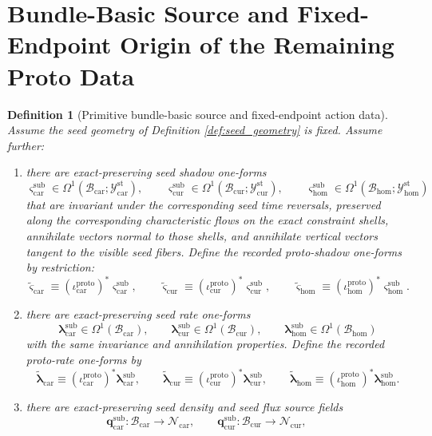 \documentclass[11pt]{article}
\newcommand{\TensorStatTagClass}{\mathcal Y_{\mathrm{car}}^{\mathrm{st}}}
\newcommand{\CurStatTagClass}{\mathcal Y_{\mathrm{cur}}^{\mathrm{st}}}
\newcommand{\HomStatTagClass}{\mathcal Y_{\mathrm{hom}}^{\mathrm{st}}}
\newcommand{\TensorDensityClass}{\mathscr N_{\mathrm{car}}}
\newcommand{\CurDensityClass}{\mathscr N_{\mathrm{cur}}}
\newcommand{\TensorProtoShadowForm}{\widetilde{\boldsymbol{\varsigma}}_{\mathrm{car}}}
\newcommand{\CurProtoShadowForm}{\widetilde{\boldsymbol{\varsigma}}_{\mathrm{cur}}}
\newcommand{\HomProtoShadowForm}{\widetilde{\boldsymbol{\varsigma}}_{\mathrm{hom}}}
\newcommand{\TensorProtoRateForm}{\widetilde{\boldsymbol{\lambda}}_{\mathrm{car}}}
\newcommand{\CurProtoRateForm}{\widetilde{\boldsymbol{\lambda}}_{\mathrm{cur}}}
\newcommand{\HomProtoRateForm}{\widetilde{\boldsymbol{\lambda}}_{\mathrm{hom}}}
\newcommand{\TensorSeedSpace}{\mathcal B_{\mathrm{car}}}
\newcommand{\CurSeedSpace}{\mathcal B_{\mathrm{cur}}}
\newcommand{\HomSeedSpace}{\mathcal B_{\mathrm{hom}}}
\newcommand{\TensorProtoInc}{\iota_{\mathrm{car}}^{\mathrm{proto}}}
\newcommand{\CurProtoInc}{\iota_{\mathrm{cur}}^{\mathrm{proto}}}
\newcommand{\HomProtoInc}{\iota_{\mathrm{hom}}^{\mathrm{proto}}}
\newcommand{\TensorSeedShadowForm}{\boldsymbol{\varsigma}_{\mathrm{car}}^{\mathrm{sub}}}
\newcommand{\CurSeedShadowForm}{\boldsymbol{\varsigma}_{\mathrm{cur}}^{\mathrm{sub}}}
\newcommand{\HomSeedShadowForm}{\boldsymbol{\varsigma}_{\mathrm{hom}}^{\mathrm{sub}}}
\newcommand{\TensorSeedRateForm}{\boldsymbol{\lambda}_{\mathrm{car}}^{\mathrm{sub}}}
\newcommand{\CurSeedRateForm}{\boldsymbol{\lambda}_{\mathrm{cur}}^{\mathrm{sub}}}
\newcommand{\HomSeedRateForm}{\boldsymbol{\lambda}_{\mathrm{hom}}^{\mathrm{sub}}}
\newcommand{\TensorSeedDensitySource}{\boldsymbol{q}_{\mathrm{car}}^{\mathrm{sub}}}
\newcommand{\CurSeedDensitySource}{\boldsymbol{q}_{\mathrm{cur}}^{\mathrm{sub}}}
\newtheorem{definition}{Definition}
\begin{document}
\section{Bundle-Basic Source and Fixed-Endpoint Origin of the Remaining Proto Data}

\begin{definition}[Primitive bundle-basic source and fixed-endpoint action data]
\label{def:seed_basic}
Assume the seed geometry of Definition \ref{def:seed_geometry} is fixed. Assume further:
\begin{enumerate}
    \item there are exact-preserving seed shadow one-forms
    \[
    \TensorSeedShadowForm\in\Omega^1(\TensorSeedSpace;\TensorStatTagClass),\qquad
    \CurSeedShadowForm\in\Omega^1(\CurSeedSpace;\CurStatTagClass),\qquad
    \HomSeedShadowForm\in\Omega^1(\HomSeedSpace;\HomStatTagClass)
    \]
    that are invariant under the corresponding seed time reversals, preserved along the corresponding characteristic flows on the exact constraint shells, annihilate vectors normal to those shells, and annihilate vertical vectors tangent to the visible seed fibers. Define the recorded proto-shadow one-forms by restriction:
    \begin{equation}
    \TensorProtoShadowForm\equiv (\TensorProtoInc)^*\TensorSeedShadowForm,\qquad
    \CurProtoShadowForm\equiv (\CurProtoInc)^*\CurSeedShadowForm,\qquad
    \HomProtoShadowForm\equiv (\HomProtoInc)^*\HomSeedShadowForm.
    \label{eq:proto_shadow_from_seed}
    \end{equation}
    \item there are exact-preserving seed rate one-forms
    \[
    \TensorSeedRateForm\in\Omega^1(\TensorSeedSpace),\qquad
    \CurSeedRateForm\in\Omega^1(\CurSeedSpace),\qquad
    \HomSeedRateForm\in\Omega^1(\HomSeedSpace)
    \]
    with the same invariance and annihilation properties. Define the recorded proto-rate one-forms by
    \begin{equation}
    \TensorProtoRateForm\equiv (\TensorProtoInc)^*\TensorSeedRateForm,\qquad
    \CurProtoRateForm\equiv (\CurProtoInc)^*\CurSeedRateForm,\qquad
    \HomProtoRateForm\equiv (\HomProtoInc)^*\HomSeedRateForm.
    \label{eq:proto_rate_from_seed}
    \end{equation}
    \item there are exact-preserving seed density and seed flux source fields
    \[
    \TensorSeedDensitySource:\TensorSeedSpace\to\TensorDensityClass,\qquad
    \CurSeedDensitySource:\CurSeedSpace\to\CurDensityClass,\qquad
\]
\end{enumerate}
\end{definition}
\end{document}
